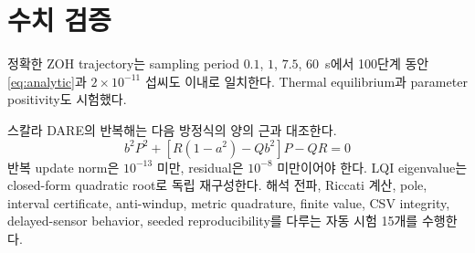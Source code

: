 \section{수치 검증}\label{sec:validation}
정확한 ZOH trajectory는 sampling period $0.1$, $1$, $7.5$, \SI{60}{s}에서 100단계 동안 \cref{eq:analytic}과 $2\times10^{-11}$ 섭씨도 이내로 일치한다. Thermal equilibrium과 parameter positivity도 시험했다.

스칼라 DARE의 반복해는 다음 방정식의 양의 근과 대조한다.
\begin{equation}
b^2P^2+[R(1-a^2)-Qb^2]P-QR=0 \label{eq:scalar-dare}
\end{equation}
반복 update norm은 $10^{-13}$ 미만, residual은 $10^{-8}$ 미만이어야 한다. LQI eigenvalue는 closed-form quadratic root로 독립 재구성한다. 해석 전파, Riccati 계산, pole, interval certificate, anti-windup, metric quadrature, finite value, CSV integrity, delayed-sensor behavior, seeded reproducibility를 다루는 자동 시험 15개를 수행한다.
